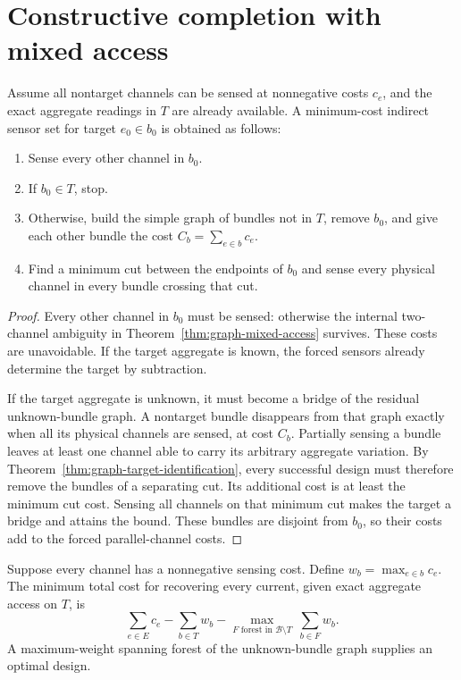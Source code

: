 \section{Constructive completion with mixed access}

\begin{proposition}
\label{prop:graph-mixed-completion}
Assume all nontarget channels can be sensed at nonnegative costs $c_e$, and
the exact aggregate readings in $T$ are already available. A minimum-cost
indirect sensor set for target $e_0\in b_0$ is obtained as follows:
\begin{enumerate}
 \item Sense every other channel in $b_0$.
 \item If $b_0\in T$, stop.
 \item Otherwise, build the simple graph of bundles not in $T$, remove
       $b_0$, and give each other bundle the cost
       $C_b=\sum_{e\in b}c_e$.
 \item Find a minimum cut between the endpoints of $b_0$ and sense every
       physical channel in every bundle crossing that cut.
\end{enumerate}
\end{proposition}

\begin{proof}
Every other channel in $b_0$ must be sensed: otherwise the internal two-channel
ambiguity in Theorem~\ref{thm:graph-mixed-access} survives. These costs are
unavoidable. If the target aggregate is known, the forced sensors already
determine the target by subtraction.

If the target aggregate is unknown, it must become a bridge of the residual
unknown-bundle graph. A nontarget bundle disappears from that graph exactly
when all its physical channels are sensed, at cost $C_b$. Partially sensing a
bundle leaves at least one channel able to carry its arbitrary aggregate
variation. By Theorem~\ref{thm:graph-target-identification}, every successful
design must therefore remove the bundles of a separating cut. Its additional
cost is at least the minimum cut cost. Sensing all channels on that minimum cut
makes the target a bridge and attains the bound. These bundles are disjoint
from $b_0$, so their costs add to the forced parallel-channel costs.
\end{proof}

\begin{proposition}
\label{prop:graph-all-targets}
Suppose every channel has a nonnegative sensing cost. Define
$w_b=\max_{e\in b}c_e$. The minimum total cost for recovering every current,
given exact aggregate access on $T$, is
\begin{equation}
 \sum_{e\in E}c_e
 -\sum_{b\in T}w_b
 -\max_{F\text{ forest in }\mathcal B\setminus T}\ \sum_{b\in F}w_b.
 \label{eq:graph-all-target-optimum}
\end{equation}
A maximum-weight spanning forest of the unknown-bundle graph supplies an
optimal design.
\end{proposition}

